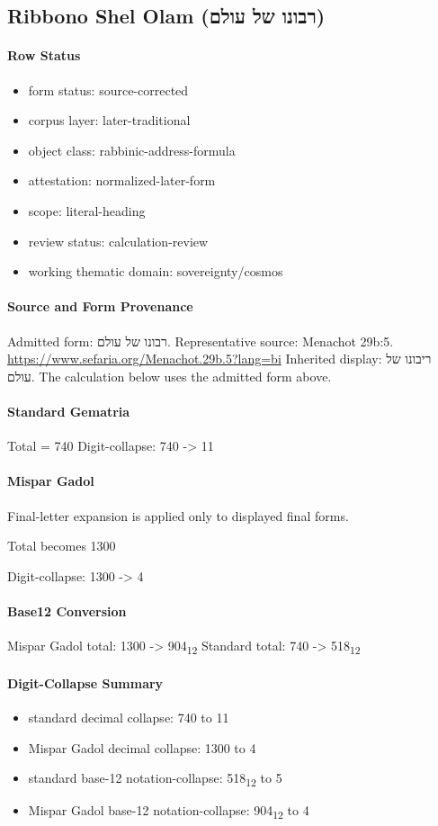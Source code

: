\subsection{Ribbono Shel Olam (רבונו של עולם)}
\paragraph{Row Status}
\begin{itemize}
\item form status: source-corrected
\item corpus layer: later-traditional
\item object class: rabbinic-address-formula
\item attestation: normalized-later-form
\item scope: literal-heading
\item review status: calculation-review
\item working thematic domain: sovereignty/cosmos
\end{itemize}
\paragraph{Source and Form Provenance}
Admitted form: רבונו של עולם.
Representative source: Menachot 29b:5.
\url{https://www.sefaria.org/Menachot.29b.5?lang=bi}
Inherited display: ריבונו של עולם. The calculation below uses the admitted form above.
\paragraph{Standard Gematria}
Total = 740
Digit-collapse: 740 -> 11
\paragraph{Mispar Gadol}
Final-letter expansion is applied only to displayed final forms.

Total becomes 1300

Digit-collapse: 1300 -> 4
\paragraph{Base12 Conversion}
Mispar Gadol total: 1300 -> 904\textsubscript{12}
Standard total: 740 -> 518\textsubscript{12}
\paragraph{Digit-Collapse Summary}
\begin{itemize}
\item standard decimal collapse: 740 to 11
\item Mispar Gadol decimal collapse: 1300 to 4
\item standard base-12 notation-collapse: 518\textsubscript{12} to 5
\item Mispar Gadol base-12 notation-collapse: 904\textsubscript{12} to 4
\end{itemize}
